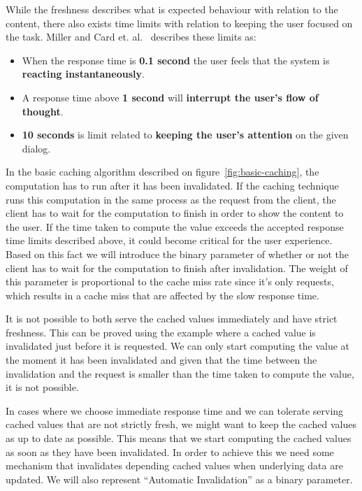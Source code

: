 
While the freshness describes what is expected behaviour with relation to the content, there also exists time limits with relation to keeping the user focused on the task. Miller and Card et. al.~\cite{paper:miller-response-time-limit, paper:card-response-time-limit} describes these limits as:

\begin{itemize}
  \item When the response time is \textbf{0.1 second} the user feels that the system is \textbf{reacting instantaneously}.
  \item A response time above \textbf{1 second} will \textbf{interrupt the user's flow of thought}.
  \item \textbf{10 seconds} is limit related to \textbf{keeping the user's attention} on the given dialog.
\end{itemize}

In the basic caching algorithm described on figure~\ref{fig:basic-caching}, the computation has to run after it has been invalidated. If the caching technique runs this computation in the same process as the request from the client, the client has to wait for the computation to finish in order to show the content to the user. If the time taken to compute the value exceeds the accepted response time limits described above, it could become critical for the user experience. Based on this fact we will introduce the binary parameter of whether or not the client has to wait for the computation to finish after invalidation. The weight of this parameter is proportional to the cache miss rate since it's only requests, which results in a cache miss that are affected by the slow response time.



It is not possible to both serve the cached values immediately and have strict freshness. This can be proved using the example where a cached value is invalidated just before it is requested. We can only start computing the value at the moment it has been invalidated and given that the time between the invalidation and the request is smaller than the time taken to compute the value, it is not possible.

In cases where we choose immediate response time and we can tolerate serving cached values that are not strictly fresh, we might want to keep the cached values as up to date as possible. This means that we start computing the cached values as soon as they have been invalidated. In order to achieve this we need some mechanism that invalidates depending cached values when underlying data are updated. We will also represent ``Automatic Invalidation'' as a binary parameter.

